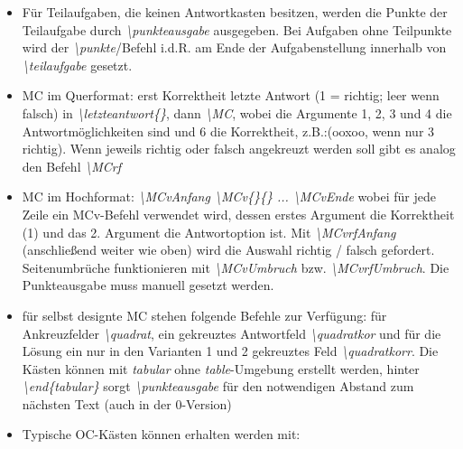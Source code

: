 \documentclass[./main.tex]{subfiles}
\begin{document}
\begin{itemize}
    \item F\"ur Teilaufgaben, die keinen Antwortkasten besitzen, werden die Punkte der Teilaufgabe durch \hypertarget{punkteausgabe}{\textit{\textbackslash punkteausgabe}} ausgegeben. Bei Aufgaben ohne Teilpunkte wird der \textit{\textbackslash punkte}\-/Befehl i.d.R. am Ende der Aufgabenstellung innerhalb von \textit{\textbackslash teilaufgabe} gesetzt. 
    \item MC im Querformat: erst Korrektheit letzte Antwort (1 = richtig; leer wenn falsch) in \textit{\textbackslash letzteantwort\{\}}, dann \hypertarget{MC}{\textit{\textbackslash MC}}, wobei die Argumente 1, 2, 3 und 4 die Antwortm\"oglichkeiten sind und 6 die Korrektheit, z.B.:(ooxoo, wenn nur 3 richtig). Wenn jeweils richtig oder falsch angekreuzt werden soll gibt es analog den Befehl \hypertarget{MCrf}{\textit{\textbackslash MCrf}}
    \item MC im Hochformat: \textit{\hypertarget{MCvAnfang}{\textbackslash MCvAnfang} \hypertarget{MCv}{\textbackslash MCv\{\}\{\}} ... \hypertarget{MCvEnde}{\textbackslash MCvEnde}} wobei f\"ur jede Zeile ein MCv-Befehl verwendet wird, dessen erstes Argument die Korrektheit (1) und das 2. Argument die Antwortoption ist. Mit \textit{\hypertarget{MCvrfAnfang}{\textbackslash MCvrfAnfang}} (anschlie\ss{}end weiter wie oben) wird die Auswahl richtig / falsch gefordert. Seitenumbr\"uche funktionieren mit \textit{\hypertarget{MCvUmbruch}{\textbackslash MCvUmbruch}} bzw. \textit{\hypertarget{MCvrfUmbruch}{\textbackslash MCvrfUmbruch}}. Die Punkteausgabe muss manuell gesetzt werden.
    \item f\"ur selbst designte MC stehen folgende Befehle zur Verf\"ugung: f\"ur Ankreuzfelder \textit{\hypertarget{quadrat}{\textbackslash quadrat}}, ein gekreuztes Antwortfeld \textit{\hypertarget{quadratkor}{\textbackslash quadratkor}} und f\"ur die L\"osung ein nur in den Varianten 1 und 2 gekreuztes Feld \textit{\hypertarget{quadratkorr}{\textbackslash quadratkorr}}. Die K\"asten k\"onnen mit \textit{tabular} ohne \textit{table}-Umgebung erstellt werden, hinter \textit{\textbackslash end\{tabular\}} sorgt \textit{\textbackslash punkteausgabe} f\"ur den notwendigen Abstand zum n\"achsten Text (auch in der 0-Version)
    \item Typische OC-K\"asten k\"onnen erhalten werden mit: \hypertarget{oc}{} \hypertarget{ocanfang}{} \hypertarget{ochilf}{} \hypertarget{ockasten}{} \\

\end{itemize}
\end{document}
